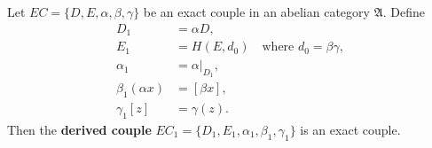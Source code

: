 Let $EC = \{D, E, \alpha, \beta, \gamma\}$ be an exact couple in an abelian category $\mathfrak{A}$. Define
\begin{align*}
D_1 &= \alpha D, \\
E_1 &= H(E, d_0) \quad \text{where } d_0 = \beta\gamma, \\
\alpha_1 &= \alpha|_{D_1}, \\
\beta_1(\alpha x) &= [\beta x], \\
\gamma_1[z] &= \gamma(z).
\end{align*}
Then the \textbf{derived couple} $EC_1 = \{D_1, E_1, \alpha_1, \beta_1, \gamma_1\}$ is an exact couple.
